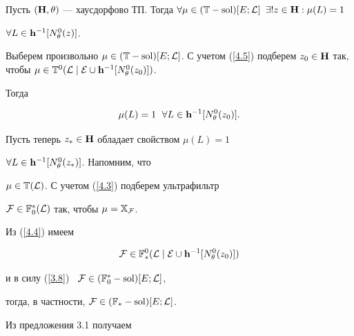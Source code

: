 {\begin{props}


Пусть $({\bold H},\theta)$ --- хаусдорфово ТП. Тогда $\fo{\mu} \in


({\Bbb T}-\sol)[E;{\cal L}]$ \; $\exi{!z} \in {\bold H}:{{\mu}(L)} = 1$


\; $\forall L \in {{\bold h}^{-1}}[{N_\theta^0}(z)]$.


\end{props}








\begin{pf}


Выберем произвольно $\mu \in ({\Bbb T}-\sol)[E;{\cal


L}]$. С учетом (\ref{4.5}) подберем ${z_0} \in {\bold H}$ так, чтобы $\mu


\in {{\Bbb T}^0}({\cal L}\mid{\cal E}\cup{{\bold h}^{-1}}[{N_\theta^0}(z_0)])$.


Тогда


$$


{{\mu}(L)} = 1\ \; \fo{L} \in {{\bold h}^{-1}}[{N_\theta^0}(z_0)].


$$


Пусть теперь ${z_*} \in {\bold H}$ обладает свойством ${{\mu}(L)} = 1$ \; 


$\forall{L} \in {{\bold h}^{-1}}[{N_\theta^0}(z_*)]$. Напомним, что


$\mu \in {{\Bbb T}({\cal L})}$. С учетом (\ref{4.3}) подберем ультрафильтр


${\cal F} \in {{\Bbb F}_0^*}({\cal L})$ так, чтобы $\mu = {{\Bbb X}_{\cal F}}$.


Из (\ref{4.4}) имеем


\begin{equation}\label{4.7}


{\cal F} \in {{\Bbb F}_*^0}({\cal L}\mid{\cal


E}\cup{{\bold h}^{-1}}[{N_\theta^0}(z_0)])


\end{equation}


и в силу (\ref{3.8}) \ ${\cal F} \in ({{\Bbb F}_0^*}-\operatorname{sol})[E;{\cal L}]$,


тогда, в частности, ${\cal F} \in ({{\Bbb F}_*}-\operatorname{sol})[E;{\cal L}]$.


Из предложения 3.1 получаем


\begin{equation}\label{4.8}



\end{equation}
\end{pf}}
